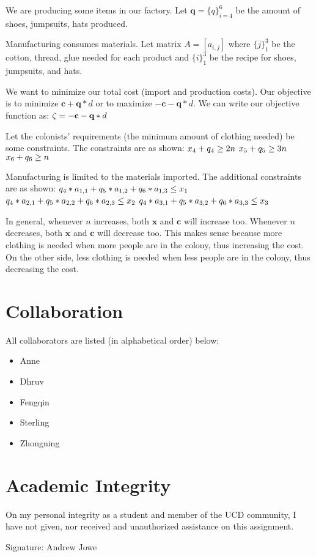 \documentclass[17pt]{extarticle}
\begin{document}
\bigskip We are producing some items in our factory. Let $\textbf{q} = \{q\}_{i=4}^6$ be the amount of shoes, jumpsuits, hats produced.

\bigskip Manufacturing consumes materials. Let matrix $A = [a_{i,j}]$ where $\{j\}_1^3$ be the cotton, thread, glue needed for each product and $\{i\}_1^3$ be the recipe for shoes, jumpsuits, and hats.

\bigskip We want to minimize our total cost (import and production costs). Our objective is to minimize $\textbf{c}+\textbf{q}*d$ or to maximize $-\textbf{c}-\textbf{q}*d$. We can write our objective function as:
$\\\zeta = -\textbf{c}-\textbf{q}*d$

\bigskip Let the colonists' requirements (the minimum amount of clothing needed) be some constraints. The constraints are as shown:
$\\x_4 + q_4 \geq 2n$
$\\x_5 + q_5 \geq 3n$
$\\x_6 + q_6 \geq n$

\bigskip Manufacturing is limited to the materials imported. The additional constraints are as shown:
$\\q_4*a_{1,1} + q_5*a_{1,2} + q_6*a_{1,3} \leq x_1$
$\\q_4*a_{2,1} + q_5*a_{2,2} + q_6*a_{2,3} \leq x_2$
$\\q_4*a_{3,1} + q_5*a_{3,2} + q_6*a_{3,3} \leq x_3$

\bigskip In general, whenever $n$ increases, both $\textbf{x}$ and $\textbf{c}$ will increase too. Whenever $n$ decreases, both $\textbf{x}$ and $\textbf{c}$ will decrease too. This makes sense because more clothing is needed when more people are in the colony, thus increasing the cost. On the other side, less clothing is needed when less people are in the colony, thus decreasing the cost.

\newpage
\section*{Collaboration}
All collaborators are listed (in alphabetical order) below:
\begin{itemize}
    \item Anne
    \item Dhruv
    \item Fengqin
    \item Sterling
    \item Zhongning
\end{itemize}

\newpage
\section*{Academic Integrity}
On my personal integrity as a student and member of the UCD community, I have not given, nor received and unauthorized assistance on this assignment.

Signature: Andrew Jowe
\end{document}
